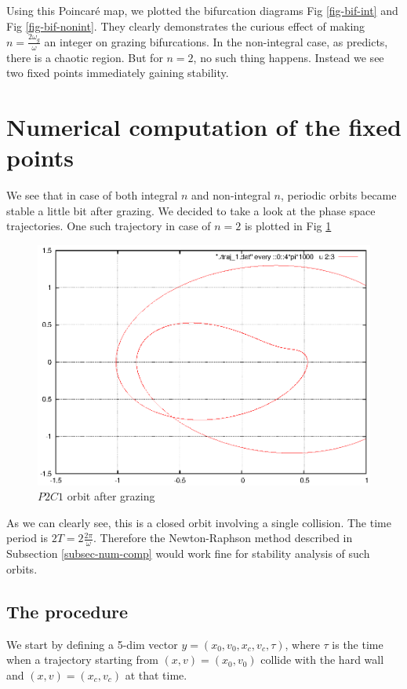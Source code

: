 \documentclass[oneside]{book}
\renewcommand{\(}{\begin{columns}}
\renewcommand{\)}{\end{columns}}
\newcommand{\<}[1]{\begin{column}{#1}}
\renewcommand{\>}{\end{column}}
\begin{document}
Using this Poincaré map, we plotted the bifurcation diagrams  Fig 
\ref{fig-bif-int} and Fig \ref{fig-bif-nonint}. They clearly demonstrates the 
curious effect of making $n=\frac{2\omega_g}{\omega}$ 
an integer on grazing bifurcations. In the non-integral case, as 
\cite{banerjee-kundu-soft,banerjee-kundu-hard} predicts, there is a chaotic 
region.  But for $n=2$, no such thing happens.  Instead we see two fixed 
points immediately gaining stability. 

\section{Numerical computation of the fixed points}
We see that in case of both integral $n$ and non-integral $n$,  periodic 
orbits became stable a little bit 
after grazing.  We decided to take a look at the phase 
space trajectories. One such trajectory in case of $n=2$ is plotted in Fig \ref{fig-traj-p2c1}
\begin{figure}[!htp]
\caption{$P2C1$ orbit after grazing}
\label{fig-traj-p2c1}
\begin{center}
\includegraphics[width=0.9\columnwidth]{after-grazing-p1-traj}
\end{center}
\end{figure}

As we can clearly see, this is a closed orbit involving a single collision.  
The time period is $2T=2\frac{2\pi}{\omega}$.  Therefore the Newton-Raphson 
method described in Subsection \ref{subsec-num-comp} would work fine for 
stability analysis of such orbits.  

\subsection{The procedure}
We start by defining a 5-dim vector $y=(x_0,v_0,x_c,v_c,\tau)$, where $\tau$ 
is the time when a trajectory starting from $(x,v)=(x_0,v_0)$ collide with the 
hard wall and $(x,v)=(x_c,v_c)$ at that time.  
\end{document}
